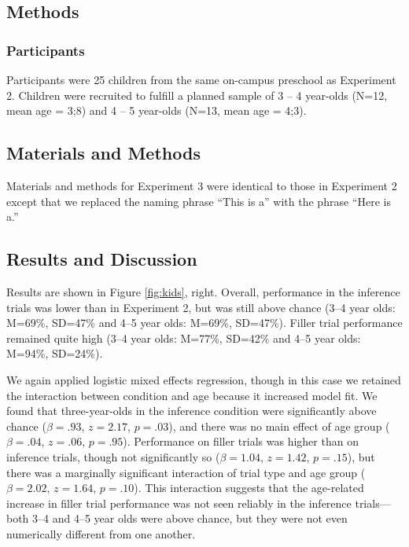 \documentclass[man,noapacite]{apa2}
\begin{document}
\subsection{Methods}

\subsubsection{Participants}

Participants were 25 children from the same on-campus preschool as Experiment 2. Children were recruited to fulfill a planned sample of 3 -- 4 year-olds (N=12, mean age = 3;8) and 4 -- 5 year-olds (N=13, mean age = 4;3).

\subsection{Materials and Methods}

Materials and methods for Experiment 3 were identical to those in Experiment 2 except that we replaced the naming phrase ``This is a'' with the phrase ``Here is a.'' 

\subsection{Results and Discussion}

Results are shown in Figure \ref{fig:kids}, right. Overall, performance in the inference trials was lower than in Experiment 2, but was still above chance (3--4 year olds: M=69\%, SD=47\% and 4--5 year olds: M=69\%, SD=47\%). Filler trial performance remained quite high (3--4 year olds: M=77\%, SD=42\% and 4--5 year olds: M=94\%, SD=24\%). 

We again applied logistic mixed effects regression, though in this case we retained the interaction between condition and age because it increased model fit. We found that three-year-olds in the inference condition were significantly above chance ($\beta = .93$, $z = 2.17$, $p = .03$), and there was no main effect of age group ($\beta = .04$, $z = .06$, $p = .95$). Performance on filler trials was higher than on inference trials, though not significantly so ($\beta = 1.04$, $z = 1.42$, $p = .15$), but there was a marginally significant interaction of trial type and age group ($\beta = 2.02$, $z = 1.64$, $p = .10$). This interaction suggests that the age-related increase in filler trial performance was not seen reliably in the inference trials---both 3--4 and 4--5 year olds were above chance, but they were not even numerically different from one another. 
\end{document}
